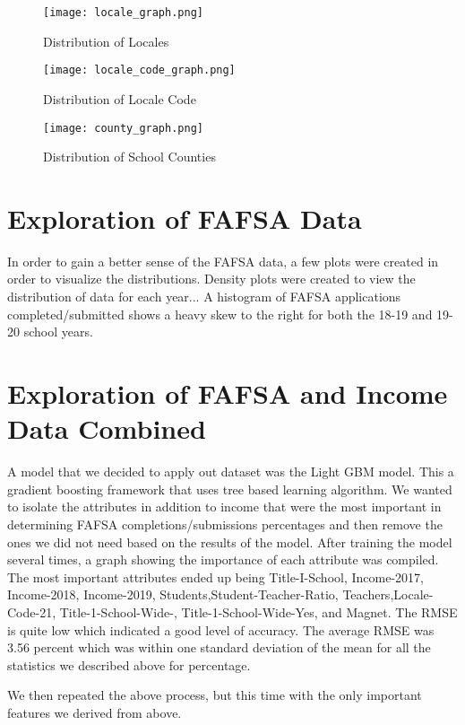 \documentclass[12pt]{article}
\begin{document}
\begin{figure}[!htb]
  \centering
  \texttt{[image: locale\_graph.png]}
  \caption{Distribution of Locales}
  \label{fig:locale}
\end{figure}

\begin{figure}[!htb]
  \centering
  \texttt{[image: locale\_code\_graph.png]}
  \caption{Distribution of Locale Code}
  \label{fig:locale_code}
\end{figure}

\begin{figure}[!htb]
  \centering
  \texttt{[image: county\_graph.png]}
  \caption{Distribution of School Counties}
  \label{fig:county}
\end{figure}


\section{Exploration of FAFSA Data}
In order to gain a better sense of the FAFSA data, a few plots were created in order to visualize the distributions. Density plots were created to view the distribution of data for each year... A histogram of FAFSA applications completed/submitted shows a heavy skew to the right for both the 18-19 and 19-20 school years.

\section{Exploration of FAFSA and Income Data Combined}
A model that we decided to apply out dataset was the Light GBM model. This a gradient boosting framework that uses tree based learning algorithm. We wanted to isolate the attributes in addition to income that were the most important in determining FAFSA completions/submissions percentages and then remove the ones we did not need based on the results of the model. After training the model several times, a graph showing the importance of each attribute was compiled. The most important attributes ended up being Title-I-School, Income-2017, Income-2018, Income-2019, Students,Student-Teacher-Ratio, Teachers,Locale-Code-21, Title-1-School-Wide-, Title-1-School-Wide-Yes, and Magnet. The RMSE is quite low which indicated a good level of accuracy. The average RMSE was 3.56 percent which was within one standard deviation of the mean for all the statistics we described above for percentage.

We then repeated the above process, but this time with the only important features we derived from above. 
\end{document}
